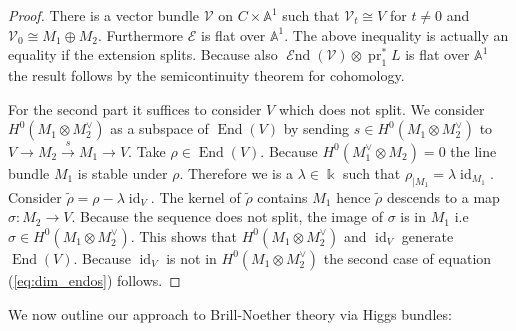 \documentclass[12pt]{extarticle}
\theoremstyle{definition}
\numberwithin{theorem}{section}
\newcommand{\Aff}{\mathbb{A}}
\newcommand{\cE}{\mathcal{E}}
\newcommand{\cV}{\mathcal{V}}
\newcommand{\op}{\operatorname}
\DeclareMathOperator{\End}{\mathcal{E}nd}
\renewcommand{\tilde}{\widetilde}		%
\begin{document}
\begin{proof}
There is a vector bundle $\cV$ on $C \times \Aff^1$ such that $\cV_t \cong V$ for $t \neq 0$ and $\cV_0 \cong M_1 \oplus M_2$. Furthermore $\cE$ is flat over $\Aff^1$.  The above inequality is actually an equality if the extension splits. Because also $\End(\cV) \otimes \op{pr}_1^*L $ is flat over $\Aff^1$ the result follows by the semicontinuity theorem for cohomology.  

For the second part it suffices to consider $V$ which does not split. We consider ${H^0(M_1 \otimes M_2^\vee)}$ as a subspace of $\op{End}(V)$ by sending $s \in H^0(M_1\otimes M_2^\vee)$ to ${V \to M_2 \xrightarrow{s} M_1 \to V} $. Take $\rho \in \op{End}(V)$. Because $H^0(M_1^\vee\otimes M_2) = 0$ the line bundle $M_1$ is stable under $\rho$. Therefore we is a $\lambda\in \Bbbk$ such that $\rho_{|M_1} = \lambda\op{id}_{M_1}$. Consider $\tilde{\rho} = \rho- \lambda\op{id}_V$. The kernel of $\tilde{\rho}$ contains $M_1$ hence $\tilde{\rho}$ descends to a map $\sigma: M_2 \to V$. Because the sequence does not split, the image of $\sigma$ is in $M_1$ i.e $\sigma \in H^0(M_1 \otimes M_2^\vee)$. This shows that $H^0(M_1 \otimes M_2^\vee)$ and $\op{id}_V$ generate $\op{End}(V)$. Because $\op{id}_V$ is not in $H^0(M_1\otimes M_2^\vee)$ the second case of equation (\ref{eq:dim_endos}) follows.
\end{proof} 
We now outline our approach to Brill-Noether theory via Higgs bundles:
\end{document}
